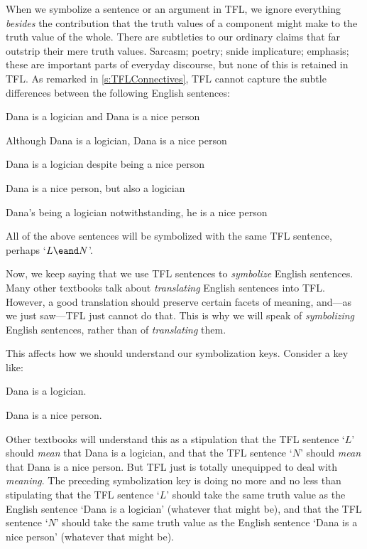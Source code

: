 When we symbolize a sentence or an argument in TFL, we ignore everything \emph{besides} the contribution that the truth values of a component might make to the truth value of the whole. There are subtleties to our ordinary claims that far outstrip their mere truth values. Sarcasm; poetry; snide implicature; emphasis; these are important parts of everyday discourse, but none of this is retained in TFL. As remarked in \cref{s:TFLConnectives}, TFL cannot capture the subtle differences between the following English sentences:
	\begin{compactlist}
		\item Dana is a logician and Dana is a nice person
		\item Although Dana is a logician, Dana is a nice person
		\item Dana is a logician despite being a nice person
		\item Dana is a nice person, but also a logician
		\item Dana's being a logician notwithstanding, he is a nice person
	\end{compactlist}
All of the above sentences will be symbolized with the same TFL sentence, perhaps `$L \eand N$'.

Now, we keep saying that we use TFL sentences to \emph{symbolize} English sentences. Many other textbooks talk about \emph{translating} English sentences into TFL. However, a good translation should preserve certain facets of meaning, and---as we just saw---TFL just cannot do that. This is why we will speak of \emph{symbolizing} English sentences, rather than of \emph{translating} them.

This affects how we should understand our symbolization keys. Consider a key like:
	\begin{ekey}
		\item[L] Dana is a logician.
		\item[N] Dana is a nice person.
	\end{ekey}
Other textbooks will understand this as a stipulation that the TFL sentence `$L$' should \emph{mean} that Dana is a logician, and that the TFL sentence `$N$' should \emph{mean} that Dana is a nice person. But TFL just is totally unequipped to deal with \emph{meaning}. The preceding symbolization key is doing no more and no less than stipulating that the TFL sentence `$L$' should take the same truth value as the English sentence `Dana is a logician' (whatever that might be), and that the TFL sentence `$N$' should take the same truth value as the English sentence `Dana is a nice person' (whatever that might be).


